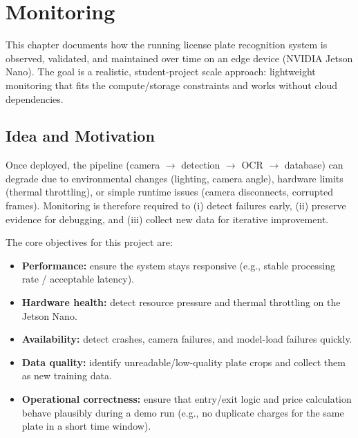 %
%
%

\chapter{Monitoring}
\label{ch:monitoring}

\noindent
This chapter documents how the running license plate recognition system is observed, validated, and maintained over time on an edge device (NVIDIA Jetson Nano).
The goal is a realistic, student-project scale approach: lightweight monitoring that fits the compute/storage constraints and works without cloud dependencies.

\section{Idea and Motivation}

\noindent
Once deployed, the pipeline (camera $\rightarrow$ detection $\rightarrow$ OCR $\rightarrow$ database) can degrade due to environmental changes (lighting, camera angle), hardware limits (thermal throttling), or simple runtime issues (camera disconnects, corrupted frames).
Monitoring is therefore required to (i) detect failures early, (ii) preserve evidence for debugging, and (iii) collect new data for iterative improvement.

\noindent
The core objectives for this project are:
\begin{itemize}
	\item \textbf{Performance:} ensure the system stays responsive (e.g., stable processing rate / acceptable latency).
	\item \textbf{Hardware health:} detect resource pressure and thermal throttling on the Jetson Nano.
	\item \textbf{Availability:} detect crashes, camera failures, and model-load failures quickly.
	\item \textbf{Data quality:} identify unreadable/low-quality plate crops and collect them as new training data.
	\item \textbf{Operational correctness:} ensure that entry/exit logic and price calculation behave plausibly during a demo run (e.g., no duplicate charges for the same plate in a short time window).
\end{itemize}

